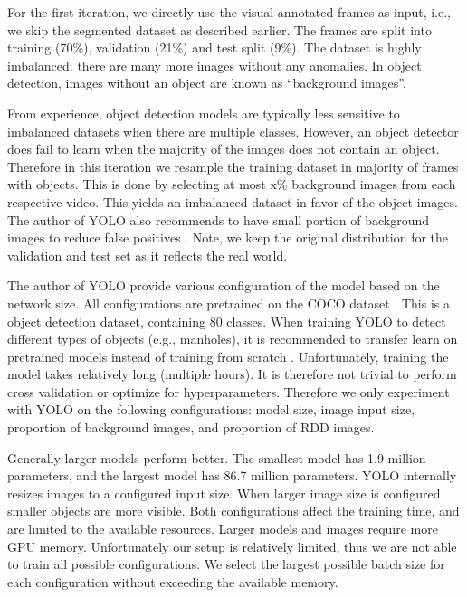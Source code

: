 For the first iteration, we directly use the visual annotated frames as input, i.e., we skip the segmented dataset as described earlier. The frames are split into training (70\%), validation (21\%) and test split (9\%). The dataset is highly imbalanced: there are many more images without any anomalies. In object detection, images without an object are known as ``background images''.

From experience, object detection models are typically less sensitive to imbalanced datasets when there are multiple classes. However, an object detector does fail to learn when the majority of the images does not contain an object. Therefore in this iteration we resample the training dataset in majority of frames with objects. This is done by selecting at most x\% background images from each respective video. This yields an imbalanced dataset in favor of the object images. The author of YOLO also recommends to have small portion of background images to reduce false positives \cite{yolo-training-tips}. Note, we keep the original distribution for the validation and test set as it reflects the real world.

The author of YOLO provide various configuration of the model based on the network size. All configurations are pretrained on the COCO dataset \cite{COCO}. This is a object detection dataset, containing 80 classes. When training YOLO to detect different types of objects (e.g., manholes), it is recommended to transfer learn on pretrained models instead of training from scratch \cite{yolo-training-tips}. Unfortunately, training the model takes relatively long (multiple hours). It is therefore not trivial to perform cross validation or optimize for hyperparameters. Therefore we only experiment with YOLO on the following configurations: model size, image input size, proportion of background images, and proportion of RDD images.

Generally larger models perform better. The smallest model  has 1.9 million parameters, and the largest model  has 86.7 million parameters. YOLO internally resizes images to a configured input size. When larger image size is configured smaller objects are more visible. Both configurations affect the training time, and are limited to the available resources. Larger models and images require more GPU memory. Unfortunately our setup is relatively limited, thus we are not able to train all possible configurations. We select the largest possible batch size for each configuration without exceeding the available memory.

